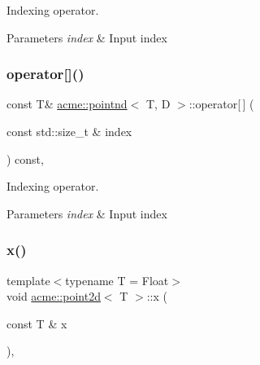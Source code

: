 Indexing operator. 


\begin{DoxyParams}{Parameters}
{\em index} & Input index \\
\hline
\end{DoxyParams}
\mbox{\label{classacme_1_1pointnd_a565e9ed195c8f8dadc570a029a3deb94}} 
\subsubsection{\texorpdfstring{operator[]()}{operator[]()}\hspace{0.1cm}{\footnotesize\ttfamily [2/2]}}
{\footnotesize\ttfamily const T\& \hyperlink{classacme_1_1pointnd}{acme\+::pointnd}$<$ T, D $>$\+::operator\mbox{[}$\,$\mbox{]} (\begin{DoxyParamCaption}\item[{const std\+::size\+\_\+t \&}]{index }\end{DoxyParamCaption}) const\hspace{0.3cm}{\ttfamily [inline]}, {\ttfamily [inherited]}}



Indexing operator. 


\begin{DoxyParams}{Parameters}
{\em index} & Input index \\
\hline
\end{DoxyParams}
\mbox{\label{classacme_1_1point2d_a158797a6603451c35bd0e2be3be3b2c8}} 
\subsubsection{\texorpdfstring{x()}{x()}}
{\footnotesize\ttfamily template$<$typename T = Float$>$ \\
void \hyperlink{classacme_1_1point2d}{acme\+::point2d}$<$ T $>$\+::x (\begin{DoxyParamCaption}\item[{const T \&}]{x }\end{DoxyParamCaption})\hspace{0.3cm}{\ttfamily [inline]}, {\ttfamily [inherited]}}



